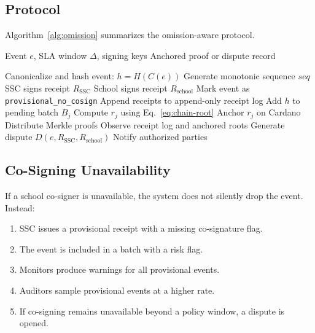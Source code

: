 \documentclass[journal]{IEEEtran}
\begin{document}
\subsection{Protocol}
Algorithm~\ref{alg:omission} summarizes the omission-aware protocol.

\begin{algorithm}[!t]
\caption{Omission-Aware Pre-Anchoring Protocol}
\label{alg:omission}
\begin{algorithmic}[1]
\REQUIRE Event $e$, SLA window $\Delta$, signing keys
\ENSURE Anchored proof or dispute record

\STATE Canonicalize and hash event: $h = H(C(e))$
\STATE Generate monotonic sequence $\mathit{seq}$
\STATE SSC signs receipt $R_{\mathrm{SSC}}$
    \STATE School signs receipt $R_{\mathrm{school}}$
\ELSE
    \STATE Mark event as \texttt{provisional\_no\_cosign}
\ENDIF
\STATE Append receipts to append-only receipt log
\STATE Add $h$ to pending batch $B_j$
    \STATE Compute $r_j$ using Eq.~\ref{eq:chain-root}
    \STATE Anchor $r_j$ on Cardano
    \STATE Distribute Merkle proofs
\ENDWHEN
{}
    \STATE Observe receipt log and anchored roots
        \STATE Generate dispute $D(e, R_{\mathrm{SSC}}, R_{\mathrm{school}})$
        \STATE Notify authorized parties
    \ENDIF
\ENDFOR
\end{algorithmic}
\end{algorithm}

\subsection{Co-Signing Unavailability}
If a school co-signer is unavailable, the system does not silently drop the event. Instead:
\begin{enumerate}[nosep,leftmargin=2em]
    \item SSC issues a provisional receipt with a missing co-signature flag.
    \item The event is included in a batch with a risk flag.
    \item Monitors produce warnings for all provisional events.
    \item Auditors sample provisional events at a higher rate.
    \item If co-signing remains unavailable beyond a policy window, a dispute is opened.
\end{enumerate}
\end{document}
